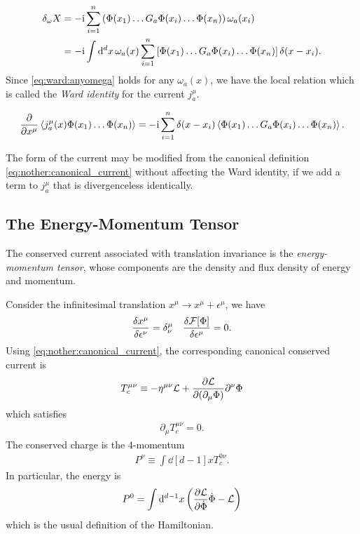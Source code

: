 \documentclass[10pt]{article}
\newcommand{\ii}{\mathrm{i}}
\newenvironment{boxmath}[1]{\begin{tcolorbox}[enhanced,attach boxed title to top center={yshift=-\tcboxedtitleheight/2},boxrule=1pt,title={\centering #1},colframe=NavyBlue!70!black,colback=NavyBlue!10,colbacktitle=NavyBlue!10,fonttitle=\scshape,coltitle=Black]}{\end{tcolorbox}}
\begin{document}
\begin{align}
    \delta_\omega X & =-\ii\sum_{i=1}^n\left(\Phi(x_1)\dots G_a\Phi(x_i)\dots\Phi(x_n)\right)\omega_a(x_i)\notag                    \\
                    & =-\ii\int\dd[d]{x}\omega_a(x)\sum_{i=1}^n\left[\Phi(x_1)\dots G_a\Phi(x_i)\dots\Phi(x_n)\right]\delta(x-x_i).
\end{align}
Since \cref{eq:ward:anyomega} holds for any $\omega_a(x)$, we have the local relation which is called the \textit{Ward identity} for the current $j^\mu_a$.
\begin{boxmath}{Ward Identity}
    \begin{align}
        \pdv{x^\mu}\expval{j^\mu_a(x)\Phi(x_1)\dots\Phi(x_n)}=-\ii\sum^n_{i=1}\delta(x-x_i)\expval{\Phi(x_1)\dots G_a\Phi(x_i)\dots\Phi(x_n)}.\label{eq:QFT:ward_identity}
    \end{align}
\end{boxmath}
\begin{remark}
    The form of the current may be modified from the canonical definition \cref{eq:nother:canonical_current} without affecting the Ward identity, if we add a term to $j^\mu_a$ that is divergenceless identically.
\end{remark}
\subsection{The Energy-Momentum Tensor}
The conserved current associated with translation invariance is the \textit{energy-momentum tensor}, whose components are the density and flux density of energy and momentum.

Consider the infinitesimal translation $x^\mu\to x^\mu+\epsilon^\mu$, we have
\begin{align}
    \fdv{x^\mu}{\epsilon^\nu}=\delta^\mu_\nu\quad\fdv{\mathcal{F}[\Phi]}{\epsilon^\mu}=0.
\end{align}
Using \cref{eq:nother:canonical_current}, the corresponding canonical conserved current is
\begin{align}
    T^{\mu\nu}_c\equiv-\eta^{\mu\nu}\mathcal{L}+\pdv{\mathcal{L}}{(\partial_\mu\Phi)}\partial^\nu\Phi
\end{align}
which satisfies
\begin{align}
    \partial_\mu T^{\mu\nu}_c=0.
\end{align}
The conserved charge is the 4-momentum
\begin{align}
    P^\nu\equiv\int\dd[d-1]{x}T^{0\nu}_c.
\end{align}
In particular, the energy is
\begin{align}
    P^0=\int\dd[d-1]{x}\left(\pdv{\mathcal{L}}{\dot{\Phi}}\dot{\Phi}-\mathcal{L}\right)
\end{align}
which is the usual definition of the Hamiltonian.
\end{document}
